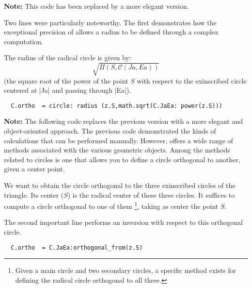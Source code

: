 \begin{tcolorbox}[
  title=Deprecated Code,
  colframe=red!50,
  colback=red!5,
  coltitle=black,
  sharp corners,
  fonttitle=\bfseries,
  leftrule=1mm,
  rightrule=1mm,
  toprule=0.5mm,
  bottomrule=0.5mm
]
\textbf{Note:} This code has been replaced by a more elegant version.

Two lines were particularly noteworthy. The first demonstrates how the exceptional precision of  allows a radius to be defined through a complex computation.

The radius of the radical circle is given by:
\[
\sqrt{\Pi(S,\mathcal{C}(Ja,Ea))}
\]
(the square root of the power of the point $S$ with respect to the exinscribed circle centered at |Ja| and passing through |Ea|).

\begin{mybox}{}
\begin{verbatim}
  C.ortho  = circle: radius (z.S,math.sqrt(C.JaEa: power(z.S)))
\end{verbatim}
\end{mybox}
\end{tcolorbox}

\begin{tcolorbox}[
  title=Revised Code,
  colframe=cyan!60!black,
  colback=cyan!5,
  coltitle=white,
  sharp corners,
  fonttitle=\bfseries,
  leftrule=1mm,
  rightrule=1mm,
  toprule=0.5mm,
  bottomrule=0.5mm
]
\textbf{Note:} The following code replaces the previous version with a more elegant and object-oriented approach.
The previous code demonstrated the kinds of calculations that can be performed manually. However,  offers a wide range of methods associated with the various geometric objects. Among the methods related to circles is one that allows you to define a circle orthogonal to another, given a center point.

We want to obtain the circle orthogonal to the three exinscribed circles of the triangle. Its center ($S$) is the radical center of these three circles. It suffices to compute a circle orthogonal to one of them \footnote{Given a main circle and two secondary circles, a specific method exists for defining the radical circle orthogonal to all three.}, taking as center the point $S$.

The second important line performs an inversion with respect to this orthogonal circle.

\begin{mybox}{}
\begin{verbatim}
  C.ortho  = C.JaEa:orthogonal_from(z.S)
\end{verbatim}
\end{mybox}
\end{tcolorbox}

